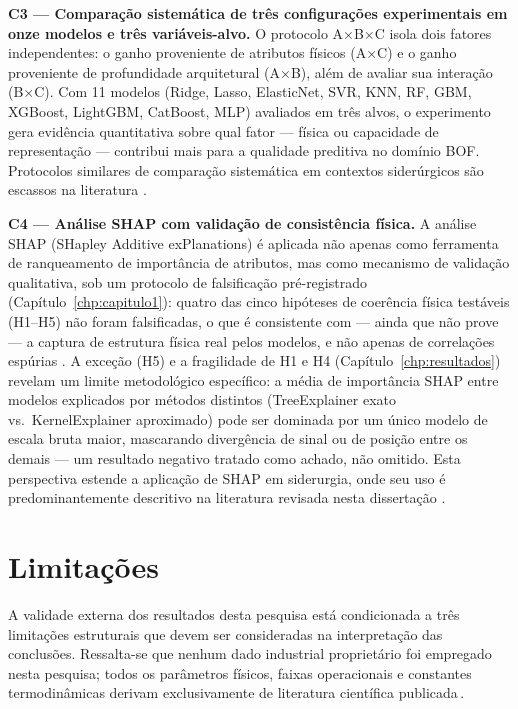 \textbf{C3 — Comparação sistemática de três configurações experimentais em onze modelos e três variáveis-alvo.} O protocolo A×B×C isola dois fatores independentes: o ganho proveniente de atributos físicos (A×C) e o ganho proveniente de profundidade arquitetural (A×B), além de avaliar sua interação (B×C). Com 11 modelos (Ridge, Lasso, ElasticNet, SVR, KNN, RF, GBM, XGBoost, LightGBM, CatBoost, MLP) avaliados em três alvos, o experimento gera evidência quantitativa sobre qual fator --- física ou capacidade de representação --- contribui mais para a qualidade preditiva no domínio BOF. Protocolos similares de comparação sistemática em contextos siderúrgicos são escassos na literatura \cite{ghalati2023review,shao2024hybrid}.

\textbf{C4 — Análise SHAP com validação de consistência física.} A análise SHAP (SHapley Additive exPlanations) é aplicada não apenas como ferramenta de ranqueamento de importância de atributos, mas como mecanismo de validação qualitativa, sob um protocolo de falsificação pré-registrado (Capítulo~\ref{chp:capitulo1}): quatro das cinco hipóteses de coerência física testáveis (H1–H5) não foram falsificadas, o que é consistente com --- ainda que não prove --- a captura de estrutura física real pelos modelos, e não apenas de correlações espúrias \cite{manojlovic2022eaf,xia2024dmpinn}. A exceção (H5) e a fragilidade de H1 e H4 (Capítulo~\ref{chp:resultados}) revelam um limite metodológico específico: a média de importância SHAP entre modelos explicados por métodos distintos (TreeExplainer exato vs.\ KernelExplainer aproximado) pode ser dominada por um único modelo de escala bruta maior, mascarando divergência de sinal ou de posição entre os demais — um resultado negativo tratado como achado, não omitido. Esta perspectiva estende a aplicação de SHAP em siderurgia, onde seu uso é predominantemente descritivo na literatura revisada nesta dissertação \cite{ghalati2023review}.


\section{Limitações}
\label{sec:limitacoes}

A validade externa dos resultados desta pesquisa está condicionada a três limitações estruturais que devem ser consideradas na interpretação das conclusões. Ressalta-se que nenhum dado industrial proprietário foi empregado nesta pesquisa; todos os parâmetros físicos, faixas operacionais e constantes termodinâmicas derivam exclusivamente de literatura científica publicada\,\cite{cai2021heat,bae2020bof,chattopadhyay2022hybrid,xia2024dmpinn}.

